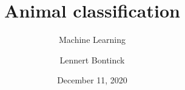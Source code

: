 \title{Animal classification}
\subtitle{Machine Learning}
\author{Lennert Bontinck}
\date{December 11, 2020}

